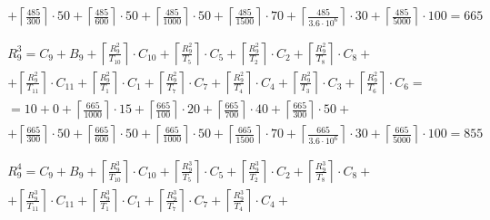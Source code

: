 \begin{gather*}
\begin{multlined}
    + \left\lceil\frac{485}{300}\right\rceil\cdot 50 + %
    \left\lceil\frac{485}{600}\right\rceil\cdot 50 + %
    \left\lceil\frac{485}{1000}\right\rceil\cdot 50 +%
    \left\lceil\frac{485}{1500}\right\rceil\cdot 70 +%
    \left\lceil\frac{485}{3.6 \cdot 10^6}\right\rceil\cdot 30 +%
    \left\lceil\frac{485}{5000}\right\rceil\cdot 100 = 665 \\
  \end{multlined} \\
  \begin{multlined}
    R_9^3 = C_9 + B_9 + \left\lceil\frac{R_9^2}{T_{10}}\right\rceil\cdot C_{10} + %
    \left\lceil\frac{R_9^2}{T_5}\right\rceil\cdot C_5 + %
    \left\lceil\frac{R_9^2}{T_2}\right\rceil\cdot C_2 + %
    \left\lceil\frac{R_9^2}{T_8}\right\rceil\cdot C_8 + \\%
    + \left\lceil\frac{R_9^2}{T_{11}}\right\rceil\cdot C_{11} + %
    \left\lceil\frac{R_9^2}{T_1}\right\rceil\cdot C_1 +%
    \left\lceil\frac{R_9^2}{T_7}\right\rceil\cdot C_7 +%
    \left\lceil\frac{R_9^2}{T_4}\right\rceil\cdot C_4 +%
    \left\lceil\frac{R_9^2}{T_3}\right\rceil\cdot C_3 +%
    \left\lceil\frac{R_9^2}{T_6}\right\rceil\cdot C_6 = \\%
    = 10 + 0 + \left\lceil\frac{665}{1000}\right\rceil\cdot 15 + %
    \left\lceil\frac{665}{100}\right\rceil\cdot 20 + %
    \left\lceil\frac{665}{700}\right\rceil\cdot 40 + %
    \left\lceil\frac{665}{300}\right\rceil\cdot 50 + \\%
    + \left\lceil\frac{665}{300}\right\rceil\cdot 50 + %
    \left\lceil\frac{665}{600}\right\rceil\cdot 50 + %
    \left\lceil\frac{665}{1000}\right\rceil\cdot 50 +%
    \left\lceil\frac{665}{1500}\right\rceil\cdot 70 +%
    \left\lceil\frac{665}{3.6 \cdot 10^6}\right\rceil\cdot 30 +%
    \left\lceil\frac{665}{5000}\right\rceil\cdot 100 = 855 \\
  \end{multlined} \\
  \begin{multlined}
    R_9^4 = C_9 + B_9 + \left\lceil\frac{R_9^3}{T_{10}}\right\rceil\cdot C_{10} + %
    \left\lceil\frac{R_9^3}{T_5}\right\rceil\cdot C_5 + %
    \left\lceil\frac{R_9^3}{T_2}\right\rceil\cdot C_2 + %
    \left\lceil\frac{R_9^3}{T_8}\right\rceil\cdot C_8 + \\%
    + \left\lceil\frac{R_9^3}{T_{11}}\right\rceil\cdot C_{11} + %
    \left\lceil\frac{R_9^3}{T_1}\right\rceil\cdot C_1 +%
    \left\lceil\frac{R_9^3}{T_7}\right\rceil\cdot C_7 +%
    \left\lceil\frac{R_9^3}{T_4}\right\rceil\cdot C_4 +%

\end{multlined}
\end{gather*}
